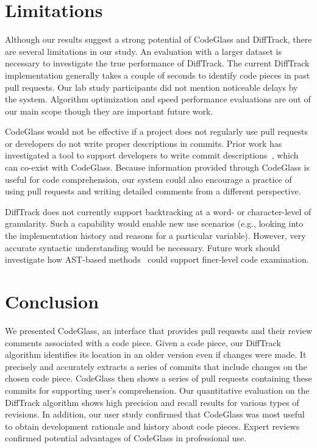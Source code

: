 \section{Limitations}
Although our results suggest a strong potential of CodeGlass and DiffTrack, there are several limitations in our study.
An evaluation with a larger dataset is necessary to investigate the true performance of DiffTrack.
The current DiffTrack implementation generally takes a couple of seconds to identify code pieces in past pull requests.
Our lab study participants did not mention noticeable delays by the system.
Algorithm optimization and speed performance evaluations are out of our main scope though they are important future work.

CodeGlass would not be effective if a project does not regularly use pull requests or developers do not write proper descriptions in commits.
Prior work has investigated a tool to support developers to write commit descriptions~\cite{ChangeScribe}, which can co-exist with CodeGlass.
Because information provided through CodeGlass is useful for code comprehension, our system could also encourage a practice of using pull requests and writing detailed comments from a different perspective. 

DiffTrack does not currently support backtracking at a word- or character-level of granularity.
Such a capability would enable new use scenarios (e.g., looking into the implementation history and reasons for a particular variable).
However, very accurate syntactic understanding would be necessary.
Future work should investigate how AST-based methods~\cite{GumTree, Change_Distilling} could support finer-level code examination.

\section{Conclusion}

We presented CodeGlass, an interface that provides pull requests and their review comments associated with a code piece.
Given a code piece, our DiffTrack algorithm identifies its location in an older version even if changes were made.
It precisely and accurately extracts a series of commits that include changes on the chosen code piece.
CodeGlass then shows a series of pull requests containing these commits for supporting user's comprehension.
Our quantitative evaluation on the DiffTrack algorithm shows high precision and recall results for various types of revisions.
In addition, our user study confirmed that CodeGlass was most useful to obtain development rationale and history about code pieces.
Expert reviews confirmed potential advantages of CodeGlass in professional use.
